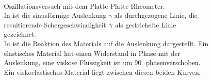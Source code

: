 \begin{figure}[h]
    \centering
    \\
    \caption{Oszillationsversuch mit dem Platte-Platte Rheometer.\\
    In  ist die sinusförmige Auslenkung $\gamma$ als durchgezogene Linie, die resultierende Schergeschwindigkeit $\dot\gamma$ als gestrichelte Linie gezeichnet.\\
    In  ist die Reaktion des Materials auf die Auslenkung dargestellt. Ein elastisches Material hat einen Widerstand in Phase mit der Auslenkung, eine viskose Flüssigkeit ist um 90$^\circ$ phasenverschoben. Ein viskoelastisches Material liegt zwischen diesen beiden Kurven.
    }
    \label{fig:schwingungsmodi}
\end{figure}
%
